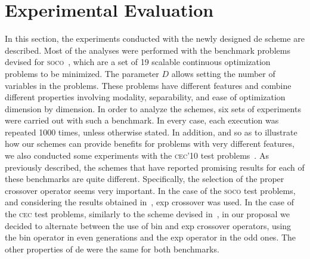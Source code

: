 \documentclass[review,3p]{elsarticle}
\newcommand{\DE}{{\sc de}}
\newcommand{\METCO}{\mbox{\sc{metco}}{}}
\begin{document}
\section{Experimental Evaluation}
\label{sec:exp}

In this section, the experiments conducted with the newly designed \DE{} scheme are described.
%
%
Most of the analyses were performed with the
benchmark problems devised for \textsc{soco}~\cite{Lozano:10}, which are a
set of 19 scalable continuous optimization problems to be minimized.
%
The parameter $D$ allows setting the number of variables in the problems.
%
These problems have different features and combine different properties
involving modality, separability, and ease of optimization dimension by dimension.
%
In order to analyze the schemes, six sets of experiments were carried out with such a benchmark.
%
In every case,
each execution was repeated 1000 times, unless otherwise stated.
%
In addition, and so as to illustrate how our schemes can provide benefits for problems with very different features,
we also conducted some experiments with the \textsc{cec'10} test problems~\cite{Tang:10}.
%
As previously described, the schemes that have reported promising results for each of these benchmarks are quite different.
%
Specifically, the selection of the proper crossover operator seems very important.
%
In the case of the \textsc{soco} test problems, and considering the results obtained in~\cite{LaTorre:11},
exp crossover was used.
%
In the case of the \textsc{cec} test problems,  similarly to the scheme devised in~\cite{Brest:10}, in our proposal we decided to
alternate between the use of bin and exp crossover operators,
using the bin operator in even generations and the exp operator
in the odd ones.
%
The other properties of \DE{} were the same for both benchmarks.
\end{document}
